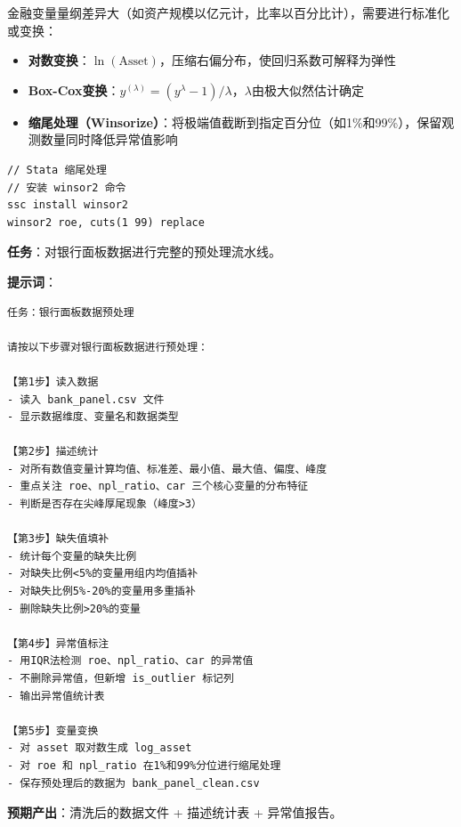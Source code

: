 金融变量量纲差异大（如资产规模以亿元计，比率以百分比计），需要进行标准化或变换：

\begin{itemize}[leftmargin=2em]
  \item \textbf{对数变换}：$\ln(\text{Asset})$，压缩右偏分布，使回归系数可解释为弹性
  \item \textbf{Box-Cox变换}：$y^{(\lambda)} = (y^\lambda - 1)/\lambda$，$\lambda$由极大似然估计确定
  \item \textbf{缩尾处理（Winsorize）}：将极端值截断到指定百分位（如1\%和99\%），保留观测数量同时降低异常值影响
\end{itemize}

\begin{lstlisting}[style=stata]
// Stata 缩尾处理
// 安装 winsor2 命令
ssc install winsor2
winsor2 roe, cuts(1 99) replace
\end{lstlisting}

\begin{practicebox}[实操：用AI完成银行面板数据预处理]
\textbf{任务}：对银行面板数据进行完整的预处理流水线。

\textbf{提示词}：

\begin{lstlisting}
任务：银行面板数据预处理

请按以下步骤对银行面板数据进行预处理：

【第1步】读入数据
- 读入 bank_panel.csv 文件
- 显示数据维度、变量名和数据类型

【第2步】描述统计
- 对所有数值变量计算均值、标准差、最小值、最大值、偏度、峰度
- 重点关注 roe、npl_ratio、car 三个核心变量的分布特征
- 判断是否存在尖峰厚尾现象（峰度>3）

【第3步】缺失值填补
- 统计每个变量的缺失比例
- 对缺失比例<5%的变量用组内均值插补
- 对缺失比例5%-20%的变量用多重插补
- 删除缺失比例>20%的变量

【第4步】异常值标注
- 用IQR法检测 roe、npl_ratio、car 的异常值
- 不删除异常值，但新增 is_outlier 标记列
- 输出异常值统计表

【第5步】变量变换
- 对 asset 取对数生成 log_asset
- 对 roe 和 npl_ratio 在1%和99%分位进行缩尾处理
- 保存预处理后的数据为 bank_panel_clean.csv
\end{lstlisting}

\textbf{预期产出}：清洗后的数据文件 + 描述统计表 + 异常值报告。
\end{practicebox}

